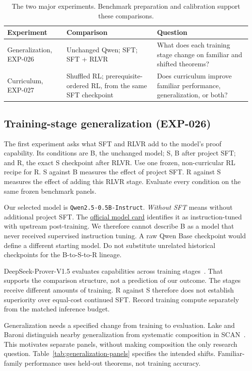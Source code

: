 \documentclass[11pt]{article}
\newcommand{\code}[1]{\texttt{#1}}
\begin{document}
\begin{table}[!htbp]
\centering
\small
\caption{The two major experiments. Benchmark preparation and calibration support these comparisons.}
\label{tab:two-experiments}
\begin{tabularx}{\textwidth}{@{}P{2.8cm}YP{4.6cm}@{}}
\toprule
Experiment & Comparison & Question \\
\midrule
Generalization, EXP-026 & Unchanged Qwen; SFT; SFT + RLVR & What does each training stage change on familiar and shifted theorems? \\
Curriculum, EXP-027 & Shuffled RL; prerequisite-ordered RL, from the same SFT checkpoint & Does curriculum improve familiar performance, generalization, or both? \\
\bottomrule
\end{tabularx}
\end{table}

\subsection{Training-stage generalization (EXP-026)}

The first experiment asks what SFT and RLVR add to the model's proof capability.
Its conditions are B, the unchanged model; S, B after project SFT; and R, the exact S checkpoint after RLVR.
Use one frozen, non-curricular RL recipe for R.
S against B measures the effect of project SFT.
R against S measures the effect of adding this RLVR stage.
Evaluate every condition on the same frozen benchmark panels.

Our selected model is \code{Qwen2.5-0.5B-Instruct}.
\emph{Without SFT} means without additional project SFT.
The \href{https://huggingface.co/Qwen/Qwen2.5-0.5B-Instruct}{official model card} identifies it as instruction-tuned with upstream post-training.
We therefore cannot describe B as a model that never received supervised instruction tuning.
A raw Qwen Base checkpoint would define a different starting model.
Do not substitute unrelated historical checkpoints for the B-to-S-to-R lineage.

DeepSeek-Prover-V1.5 evaluates capabilities across training stages~\cite{deepseekprover15}.
That supports the comparison structure, not a prediction of our outcome.
The stages receive different amounts of training.
R against S therefore does not establish superiority over equal-cost continued SFT.
Record training compute separately from the matched inference budget.

Generalization needs a specified change from training to evaluation.
Lake and Baroni distinguish nearby generalization from systematic composition in SCAN~\cite{lakebaroni2018}.
This motivates separate panels, without making composition the only research question.
Table~\ref{tab:generalization-panels} specifies the intended shifts.
Familiar-family performance uses held-out theorems, not training accuracy.
\end{document}
